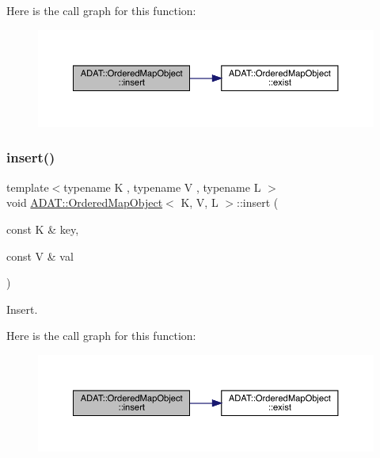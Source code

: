 Here is the call graph for this function\+:
\nopagebreak
\begin{figure}[H]
\begin{center}
\leavevmode
\includegraphics[width=350pt]{db/d8c/classADAT_1_1OrderedMapObject_a6466cef0224cef7a1e943b32da6e3410_cgraph}
\end{center}
\end{figure}
\mbox{\label{classADAT_1_1OrderedMapObject_a6466cef0224cef7a1e943b32da6e3410}} 
\subsubsection{\texorpdfstring{insert()}{insert()}\hspace{0.1cm}{\footnotesize\ttfamily [2/2]}}
{\footnotesize\ttfamily template$<$typename K , typename V , typename L $>$ \\
void \mbox{\hyperlink{classADAT_1_1OrderedMapObject}{A\+D\+A\+T\+::\+Ordered\+Map\+Object}}$<$ K, V, L $>$\+::insert (\begin{DoxyParamCaption}\item[{const K \&}]{key,  }\item[{const V \&}]{val }\end{DoxyParamCaption})\hspace{0.3cm}{\ttfamily [inline]}}



Insert. 

Here is the call graph for this function\+:
\nopagebreak
\begin{figure}[H]
\begin{center}
\leavevmode
\includegraphics[width=350pt]{db/d8c/classADAT_1_1OrderedMapObject_a6466cef0224cef7a1e943b32da6e3410_cgraph}
\end{center}
\end{figure}
\mbox{\label{classADAT_1_1OrderedMapObject_ad376a69c5761afe8fe44d3a24c44ba4c}} 
